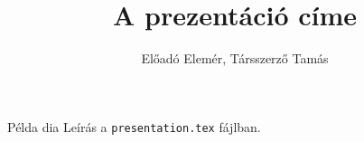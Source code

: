 \documentclass[t,14pt,aspectratio=43]{beamer}
\title{A prezentáció címe}
\author{Előadó Elemér, Társszerző Tamás}
\begin{document}
\begin{frame}
  \titlepage
\end{frame}
  
\begin{frame}{Példa dia}
  Leírás a \texttt{presentation.tex} fájlban.
\end{frame}
\end{document}
